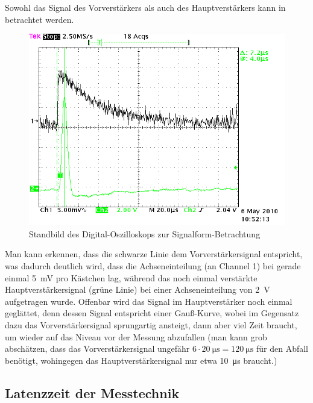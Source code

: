 Sowohl das Signal des Vorverstärkers als auch des Hauptverstärkers kann in
 betrachtet werden.
\begin{figure}[htb]
      \centering
      \includegraphics[width=1\columnwidth,keepaspectratio]{signalform}
      \caption{Standbild des Digital-Oszilloskops zur Signalform-Betrachtung}
      \label{fig:signalform}
\end{figure}

Man kann erkennen, dass die schwarze Linie dem Vorverstärkersignal entspricht,
was dadurch deutlich wird, dass die Achseneinteilung (an Channel 1) bei gerade
einmal \SI{5}{\milli\volt} pro Kästchen lag, während das noch einmal verstärkte
Hauptverstärkersignal (grüne Linie) bei einer Achseneinteilung von
\SI{2}{\volt} aufgetragen wurde. Offenbar wird das Signal im Hauptverstärker
noch einmal geglättet, denn dessen Signal entspricht einer Gauß-Kurve, wobei im
Gegensatz dazu das Vorverstärkersignal sprungartig ansteigt, dann aber viel
Zeit braucht, um wieder auf das Niveau vor der Messung abzufallen (man kann
grob abschätzen, dass das Vorverstärkersignal ungefähr
$6\cdot\SI{20}{\micro\second} = \SI{120}{\micro\second}$ für den Abfall
benötigt, wohingegen das Hauptverstärkersignal nur etwa \SI{10}{\micro\second}
braucht.)

\subsection{Latenzzeit der Messtechnik}

